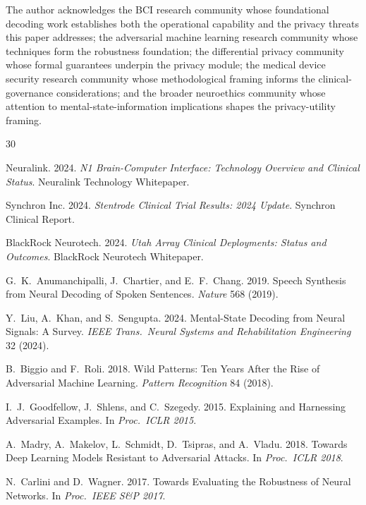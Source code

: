 \documentclass[sigconf,nonacm]{acmart}
\begin{document}
\begin{acks}
The author acknowledges the BCI research community whose
foundational decoding work establishes both the operational
capability and the privacy threats this paper addresses; the
adversarial machine learning research community whose techniques
form the robustness foundation; the differential privacy community
whose formal guarantees underpin the privacy module; the medical
device security research community whose methodological framing
informs the clinical-governance considerations; and the broader
neuroethics community whose attention to mental-state-information
implications shapes the privacy-utility framing.
\end{acks}

\sloppy

\begin{thebibliography}{30}

Neuralink. 2024. \textit{N1 Brain-Computer Interface: Technology
Overview and Clinical Status}. Neuralink Technology Whitepaper.

Synchron Inc. 2024. \textit{Stentrode Clinical Trial Results:
2024 Update}. Synchron Clinical Report.

BlackRock Neurotech. 2024. \textit{Utah Array Clinical Deployments:
Status and Outcomes}. BlackRock Neurotech Whitepaper.

G.~K.~Anumanchipalli, J.~Chartier, and E.~F.~Chang. 2019. Speech
Synthesis from Neural Decoding of Spoken Sentences.
\textit{Nature} 568 (2019).

Y.~Liu, A.~Khan, and S.~Sengupta. 2024. Mental-State Decoding from
Neural Signals: A Survey.
\textit{IEEE Trans.\ Neural Systems and Rehabilitation Engineering}
32 (2024).

B.~Biggio and F.~Roli. 2018. Wild Patterns: Ten Years After the
Rise of Adversarial Machine Learning. \textit{Pattern Recognition}
84 (2018).

I.~J.~Goodfellow, J.~Shlens, and C.~Szegedy. 2015. Explaining and
Harnessing Adversarial Examples. In \textit{Proc.\ ICLR 2015}.

A.~Madry, A.~Makelov, L.~Schmidt, D.~Tsipras, and A.~Vladu. 2018.
Towards Deep Learning Models Resistant to Adversarial Attacks.
In \textit{Proc.\ ICLR 2018}.

N.~Carlini and D.~Wagner. 2017. Towards Evaluating the Robustness
of Neural Networks. In \textit{Proc.\ IEEE S\&P 2017}.


\end{thebibliography}
\end{document}
